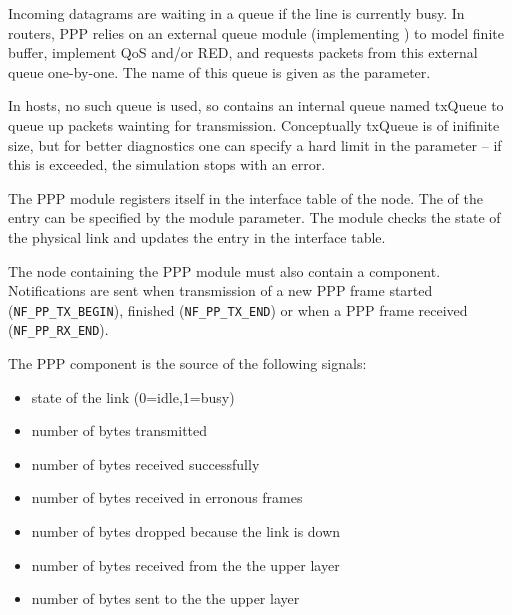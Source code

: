 Incoming datagrams are waiting in a queue if the line is currently busy.
In routers, PPP relies on an external queue module (implementing 
) to model finite buffer, implement QoS and/or RED,
and requests packets from this external queue one-by-one. The name
of this queue is given as the  parameter.

In hosts, no such queue is used, so  contains an internal
queue named txQueue to queue up packets wainting for transmission.
Conceptually txQueue is of inifinite size, but for better diagnostics
one can specify a hard limit in the  parameter -- if
this is exceeded, the simulation stops with an error.

The PPP module registers itself in the interface table of the node.
The  of the entry can be specified by the
 module parameter. The module checks the state of the physical link
and updates the entry in the interface table.



The node containing the PPP module must also contain a
 component. Notifications are sent when
transmission of a new PPP frame started (\verb!NF_PP_TX_BEGIN!), finished
(\verb!NF_PP_TX_END!) or when a PPP frame received (\verb!NF_PP_RX_END!).

The PPP component is the source of the following signals:
\begin{itemize}
\item {} state of the link (0=idle,1=busy)
\item {} number of bytes transmitted
\item {} number of bytes received successfully
\item {} number of bytes received in erronous frames
\item {} number of bytes dropped because the link is down
\item {} number of bytes received from the the upper layer
\item {} number of bytes sent to the the upper layer
\end{itemize}

